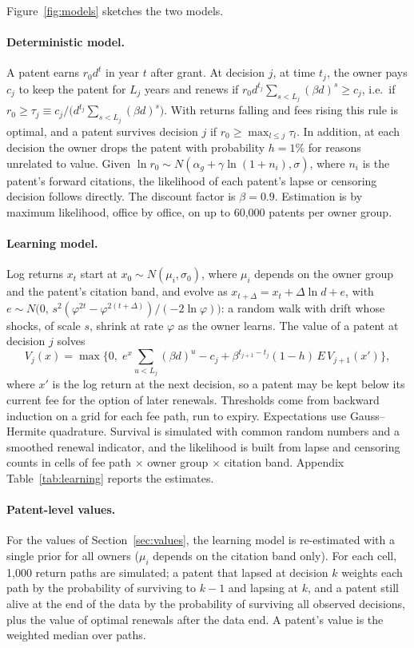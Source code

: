 Figure~\ref{fig:models} sketches the two models.

\paragraph{Deterministic model.} A patent earns $r_0 d^t$ in year $t$ after grant. At decision $j$, at time $t_j$,
the owner pays $c_j$ to keep the patent for $L_j$ years and renews if
$r_0 d^{t_j} \sum_{s<L_j} (\beta d)^s \ge c_j$, i.e.\ if $r_0 \ge \tau_j \equiv c_j / \big(d^{t_j} \sum_{s<L_j} (\beta d)^s\big)$. With returns falling and fees rising
this rule is optimal, and a patent survives decision $j$ if $r_0 \ge \max_{l\le j}\tau_l$. In addition, at each
decision the owner drops the patent with probability $h = 1\%$ for reasons unrelated to value. Given
$\ln r_0 \sim N(\alpha_g + \gamma \ln(1+n_i), \sigma)$, where $n_i$ is the patent's forward citations, the likelihood of each patent's lapse or censoring decision
follows directly. The discount factor is $\beta = 0.9$. Estimation is by maximum likelihood, office by office, on up
to 60{,}000 patents per owner group.

\paragraph{Learning model.} Log returns $x_t$ start at $x_0 \sim N(\mu_i, \sigma_0)$, where $\mu_i$ depends on the owner group and the
patent's citation band, and evolve as
$x_{t+\Delta} = x_t + \Delta \ln d + e$, with $e \sim N\big(0,\, s^2(\varphi^{2t}-\varphi^{2(t+\Delta)})/(-2\ln\varphi)\big)$:
a random walk with drift whose shocks, of scale $s$, shrink at rate $\varphi$ as the owner learns. The value of a patent at decision
$j$ solves
\[
V_j(x) = \max\Big\{0,\; e^x \sum_{u<L_j} (\beta d)^u - c_j + \beta^{t_{j+1}-t_j} (1-h)\, E\,V_{j+1}(x')\Big\},
\]
where $x'$ is the log return at the next decision, so a patent may be kept below its current fee for the option of later renewals. Thresholds come from backward
induction on a grid for each fee path, run to expiry. Expectations use Gauss--Hermite quadrature. Survival is
simulated with common random numbers and a smoothed renewal indicator, and the likelihood is built from lapse and
censoring counts in cells of fee path $\times$ owner group $\times$ citation band. Appendix
Table~\ref{tab:learning} reports the estimates.

\paragraph{Patent-level values.} For the values of Section~\ref{sec:values}, the learning model is re-estimated with a single prior for all owners
($\mu_i$ depends on the citation band only). For each cell, 1{,}000 return paths are simulated; a patent that lapsed at
decision $k$ weights each path by the probability of surviving to $k-1$ and lapsing at $k$, and a patent still alive
at the end of the data by the probability of surviving all observed decisions, plus the value of optimal renewals
after the data end. A patent's value is the weighted median over paths.

